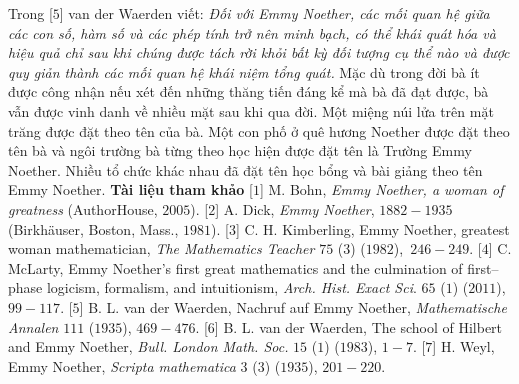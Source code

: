 \begin{multicols}{2}
	\vskip 0.05cm
	Trong [$5$] van der Waerden viết:
	\vskip 0.05cm
	\textit{Đối với Emmy Noether, các mối quan hệ giữa các con số, hàm số và các phép tính trở nên minh bạch, có thể khái quát hóa và hiệu quả chỉ sau khi chúng được tách rời khỏi bất kỳ đối tượng cụ thể nào và được quy giản thành các mối quan hệ khái niệm tổng quát.}
	\vskip 0.05cm
	Mặc dù trong đời bà ít được công nhận nếu xét đến những thăng tiến đáng kể mà bà đã đạt được, bà vẫn được vinh danh về nhiều mặt sau khi qua đời. Một miệng núi lửa trên mặt trăng được đặt theo tên của bà. Một con phố ở quê hương Noether được đặt theo tên bà và ngôi trường bà từng theo học hiện được đặt tên là Trường Emmy Noether. Nhiều tổ chức khác nhau đã đặt tên học bổng và bài giảng theo tên Emmy Noether.
	\vskip 0.05cm
	\textbf{\color{lichsutoanhoc}Tài liệu tham khảo}
	\vskip 0.05cm
	[$1$] M. Bohn, \textit{Emmy Noether, a woman of greatness} (AuthorHouse, $2005$).
	\vskip 0.05cm
	[$2$] A. Dick, \textit{Emmy Noether}, $1882-1935$ (Birkhäuser, Boston, Mass., $1981$).
	\vskip 0.05cm
	[$3$] C. H. Kimberling, Emmy Noether, greatest woman mathematician, \textit{The Mathematics Teacher} $75$ ($3$) ($1982$),~$246-249$.
	\vskip 0.05cm
	[$4$] C. McLarty, Emmy Noether's first great mathematics and the culmination of first--phase logicism, formalism, and intuitionism, \textit{Arch. Hist. Exact Sci}. $65$ ($1$) ($2011$), $99-117$.
	\vskip 0.05cm
	[$5$] B. L. van der Waerden, Nachruf auf Emmy Noether, \textit{Mathematische Annalen} $111$ ($1935$), $469-476$.
	\vskip 0.05cm
	[$6$] B. L. van der Waerden, The school of Hilbert and Emmy Noether, \textit{Bull. London Math. Soc.} $15$ ($1$) ($1983$), $1-7$.
	\vskip 0.05cm
	[$7$] H. Weyl, Emmy Noether, \textit{Scripta mathematica} $3$ ($3$) ($1935$), $201-220$.
\end{multicols}